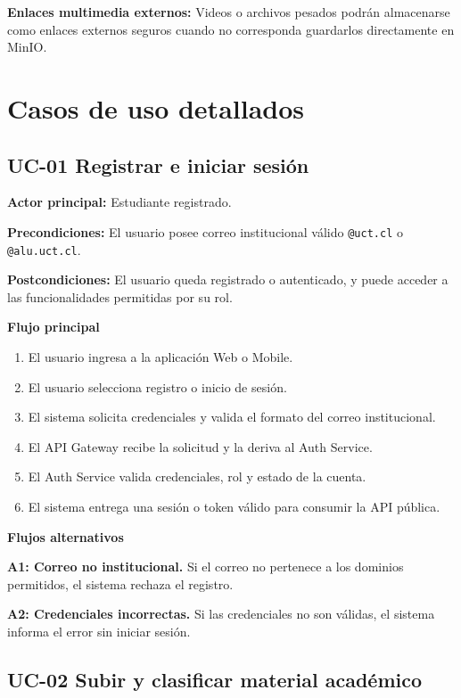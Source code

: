 \documentclass[12pt,a4paper]{article}
\begin{document}
\noindent\textbf{Enlaces multimedia externos:} Videos o archivos pesados podrán almacenarse como enlaces externos seguros cuando no corresponda guardarlos directamente en MinIO.

\section{Casos de uso detallados}

\subsection{UC-01 Registrar e iniciar sesión}

\noindent\textbf{Actor principal:} Estudiante registrado.

\noindent\textbf{Precondiciones:} El usuario posee correo institucional válido \texttt{@uct.cl} o \texttt{@alu.uct.cl}.

\noindent\textbf{Postcondiciones:} El usuario queda registrado o autenticado, y puede acceder a las funcionalidades permitidas por su rol.

\noindent\textbf{Flujo principal}

\begin{enumerate}
    \item El usuario ingresa a la aplicación Web o Mobile.
    \item El usuario selecciona registro o inicio de sesión.
    \item El sistema solicita credenciales y valida el formato del correo institucional.
    \item El API Gateway recibe la solicitud y la deriva al Auth Service.
    \item El Auth Service valida credenciales, rol y estado de la cuenta.
    \item El sistema entrega una sesión o token válido para consumir la API pública.
\end{enumerate}

\noindent\textbf{Flujos alternativos}

\noindent\textbf{A1: Correo no institucional.} Si el correo no pertenece a los dominios permitidos, el sistema rechaza el registro.

\noindent\textbf{A2: Credenciales incorrectas.} Si las credenciales no son válidas, el sistema informa el error sin iniciar sesión.

\subsection{UC-02 Subir y clasificar material académico}
\end{document}
